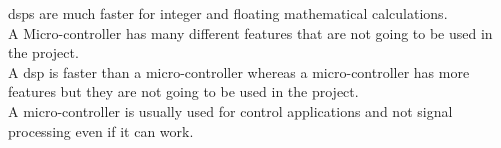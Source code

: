 \gls{dsp}s are much faster for integer and floating mathematical calculations.  \\

A Micro-controller has many different features that are not going to be used in the project. \\

A \gls{dsp} is faster than a micro-controller whereas a micro-controller has more features but they are not going to be used in the project. \\

A micro-controller is usually used for control applications and not signal processing even if it can work.








